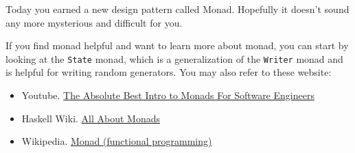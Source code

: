\documentclass{beamer}
\begin{document}
\begin{framek}[Conclusion]
	Today you earned a new design pattern called Monad. Hopefully it doesn't sound any more mysterious and difficult for you.
	\medskip

	If you find monad helpful and want to learn more about monad, you can start by looking at the {\tt State} monad, which is a generalization of the {\tt Writer} monad and is helpful for writing random generators. You may also refer to these website:
	\begin{itemize}
		\item Youtube. \href{https://www.youtube.com/watch?v=C2w45qRc3aU}{The Absolute Best Intro to Monads For Software Engineers}
		\item Haskell Wiki. \href{https://wiki.haskell.org/All_About_Monads}{All About Monads}
		\item Wikipedia. \href{https://en.wikipedia.org/wiki/Monad_(functional_programming)}{Monad (functional programming)}
	\end{itemize}
\end{framek}
\end{document}
